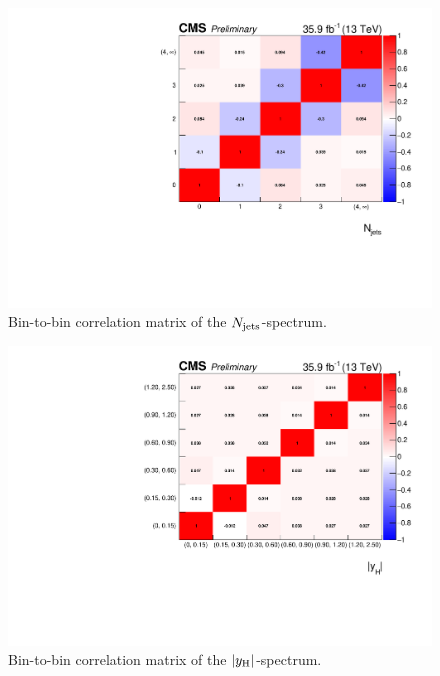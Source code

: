 \begin{figure}[hbtp]
  \begin{center}
    \includegraphics[width=\cmsFigWidth]{img/correlationMatrices/corrMat_CORRMAT_combinedCard_NJ_smH_Nov12_MultiDimFit_mH125.pdf}
    \caption{
        Bin-to-bin correlation matrix of the $N_\text{jets}$-spectrum.
        }
    \label{fig:corrMat_njets}
  \end{center}
\end{figure}

\begin{figure}[hbtp]
  \begin{center}
    \includegraphics[width=\cmsFigWidth]{img/correlationMatrices/corrMat_CORRMAT_combinedCard_YH_smH_Nov28_MultiDimFit_mH125.pdf}
    \caption{
        Bin-to-bin correlation matrix of the $\left|y_\text{H}\right|$-spectrum.
        }
    \label{fig:corrMat_absy}
  \end{center}
\end{figure}


